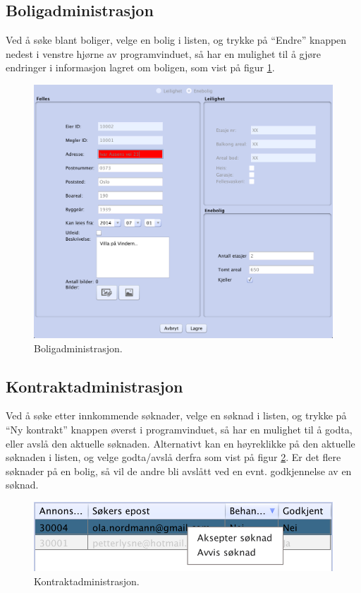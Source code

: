 \newpage
\subsection{Boligadministrasjon}
Ved å søke blant boliger, velge en bolig i listen, og trykke på “Endre” knappen nedest i venstre
hjørne av programvinduet, så har en mulighet til å gjøre endringer i informasjon lagret om boligen,
som vist på figur \ref{fig:bv:13}.

\begin{figure}[h!]
 \includegraphics[width=\textwidth,height=\textheight,keepaspectratio]{./img/brukerveiledning/13.png}
 \caption{Boligadministrasjon.}
 \label{fig:bv:13}
\end{figure}


\newpage
\subsection{Kontraktadministrasjon}
Ved å søke etter innkommende søknader, velge en søknad i listen, og trykke på “Ny kontrakt”
knappen øverst i programvinduet, så har en mulighet til å godta, eller avslå den aktuelle søknaden.
Alternativt kan en høyreklikke på den aktuelle søknaden i listen, og velge godta/avslå derfra som
vist på figur \ref{fig:bv:14}. Er det flere søknader på en bolig, så vil de andre bli avslått ved en evnt.
godkjennelse av en søknad.

\begin{figure}[h!]
\center
 \includegraphics[scale=0.5]{./img/brukerveiledning/14.png}
 \caption{Kontraktadministrasjon.}
 \label{fig:bv:14}
\end{figure}



